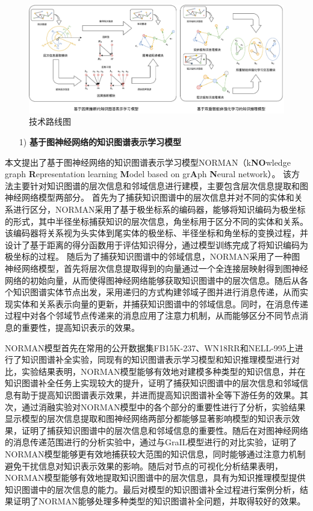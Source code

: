 \documentclass[algorithmlist, AutoFakeBold, AutoFakeSlant, figurelist, tablelist, nomlist, engineering, openany]{seuthesix} %
\begin{document}
\begin{figure}[h]
  \centering
  \includegraphics[width=1.0\textwidth]{1_Total}
  \caption{技术路线图}
  \label{1_Total}
\end{figure}

\begin{itemize}[leftmargin=*]
  \item [1)]\textbf{基于图神经网络的知识图谱表示学习模型}
\end{itemize}


本文提出了基于图神经网络的知识图谱表示学习模型NORMAN（k\textbf{NO}wledge graph \textbf{R}epresentation learning \textbf{M}odel based on gr\textbf{A}ph \textbf{N}eural network）。
该方法主要针对知识图谱的层次信息和邻域信息进行建模，主要包含层次信息提取和图神经网络模型两部分。
首先为了捕获知识图谱中的层次信息并对不同的实体和关系进行区分，NORMAN采用了基于极坐标系的编码器，能够将知识编码为极坐标的形式，其中半径坐标捕获知识的层次信息，角坐标用于区分不同的实体和关系。该编码器将关系视为头实体到尾实体的极坐标、半径坐标和角坐标的变换过程，并设计了基于距离的得分函数用于评估知识得分，通过模型训练完成了将知识编码为极坐标的过程。
随后为了捕获知识图谱中的邻域信息，NORMAN采用了一种图神经网络模型，首先将层次信息提取得到的向量通过一个全连接层映射得到图神经网络的初始向量，从而使得图神经网络能够获取知识图谱中的层次信息。随后从各个知识图谱实体节点出发，采用递归的方式构建邻域子图并进行消息传递，从而实现实体和关系表示向量的更新，并捕获知识图谱中的邻域信息。同时，在消息传递过程中对各个邻域节点传递来的消息应用了注意力机制，从而能够区分不同节点消息的重要性，提高知识表示的效果。

NORMAN模型首先在常用的公开数据集FB15K-237、WN18RR和NELL-995上进行了知识图谱补全实验，同现有的知识图谱表示学习模型和知识推理模型进行对比，实验结果表明，NORMAN模型能够有效地对建模多种类型的知识信息，并在知识图谱补全任务上实现较大的提升，证明了捕获知识图谱中的层次信息和邻域信息有助于提高知识图谱表示效果，并进而提高知识图谱补全等下游任务的效果。其次，通过消融实验对NORMAN模型中的各个部分的重要性进行了分析，实验结果显示模型的层次信息提取和图神经网络两部分都能够显著影响模型的知识表示效果，证明了捕获知识图谱中的层次信息和邻域信息的重要性。随后在对图神经网络的消息传递范围进行的分析实验中，通过与GraIL模型进行的对比实验，证明了NORMAN模型能够更有效地捕获较大范围的知识信息，同时能够通过注意力机制避免干扰信息对知识表示效果的影响。随后对节点的可视化分析结果表明，NORMAN模型能够有效地提取知识图谱中的层次信息，具有为知识推理模型提供知识图谱中的层次信息的能力。最后对模型的知识图谱补全过程进行案例分析，结果证明了NORMAN能够处理多种类型的知识图谱补全问题，并取得较好的效果。
\end{document}
